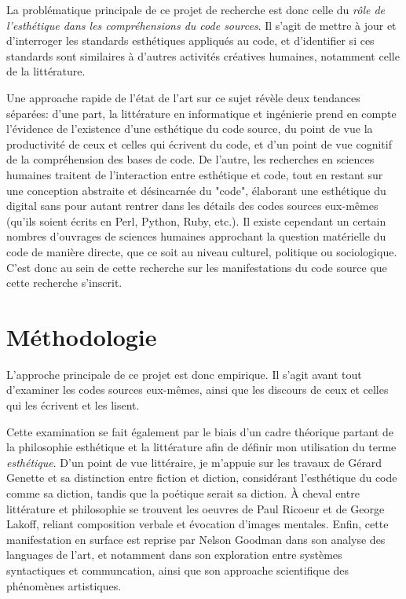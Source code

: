 \documentclass{article}
\begin{document}
La problématique principale de ce projet de recherche est donc celle du \emph{rôle de l'esthétique dans les compréhensions du code sources}. Il s'agit de mettre à jour et d'interroger les standards esthétiques appliqués au code, et d'identifier si ces standards sont similaires à d'autres activités créatives humaines, notamment celle de la littérature.

Une approache rapide de l'état de l'art sur ce sujet révèle deux tendances séparées: d'une part, la littérature en informatique et ingénierie prend en compte l'évidence de l'existence d'une esthétique du code source, du point de vue la productivité de ceux et celles qui écrivent du code, et d'un point de vue cognitif de la compréhension des bases de code\cite{oram_beautiful_2007,cox_programming_2009,gabriel_mob_2001,martin_clean_2008,detienne_software_2012,weinberg_psychology_1998}. De l'autre, les recherches en sciences humaines traitent de l'interaction entre esthétique et code, tout en restant sur une conception abstraite et désincarnée du "code", élaborant une esthétique du digital sans pour autant rentrer dans les détails des codes sources eux-mêmes (qu'ils soient écrits en Perl, Python, Ruby, etc.)\cite{cramer_executupable_2019,hayles_my_2010,mackenzie_cutting_2006,levy_programmation_1992}. Il existe cependant un certain nombres d'ouvrages de sciences humaines approchant la question matérielle du code de manière directe, que ce soit au niveau culturel\cite{montfort_10_2014}, politique\cite{cox_speaking_2013} ou sociologique\cite{paloque-berges_poetique_2009}. C'est donc au sein de cette recherche sur les manifestations du code source que cette recherche s'inscrit.

\section{Méthodologie}

L'approche principale de ce projet est donc empirique. Il s'agit avant tout d'examiner les codes sources eux-mêmes, ainsi que les discours de ceux et celles qui les écrivent et les lisent.

Cette examination se fait également par le biais d'un cadre théorique partant de la philosophie esthétique et la littérature afin de définir mon utilisation du terme \emph{esthétique}. D'un point de vue littéraire, je m'appuie sur les travaux de Gérard Genette et sa distinction entre fiction et diction\cite{genette_fiction_1993}, considérant l'esthétique du code comme sa diction, tandis que la poétique serait sa diction. À cheval entre littérature et philosophie se trouvent les oeuvres de Paul Ricoeur\cite{ricoeur_rule_2003} et de George Lakoff\cite{lakoff_metaphors_1980}, reliant composition verbale et évocation d'images mentales. Enfin, cette manifestation en surface est reprise par Nelson Goodman dans son analyse des languages de l'art\cite{goodman_languages_1976}, et notamment dans son exploration entre systèmes syntactiques et communcation, ainsi que son approache scientifique des phénomènes artistiques.
\end{document}
